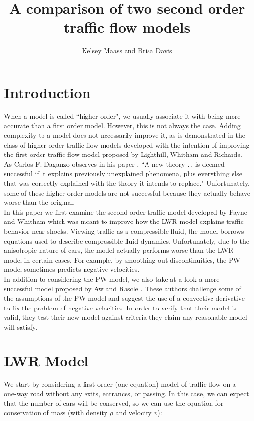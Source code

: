 \documentclass{article}
\title{A comparison of two second order traffic flow models}
\author{Kelsey Maass and Brisa Davis}
\begin{document}
\maketitle

\section{Introduction}
When a model is called ``higher order", we usually associate it with being more accurate than a first order model.  However, this is not always the case.  Adding complexity to a model does not necessarily improve it, as is demonstrated in the class of higher order traffic flow models developed with the intention of improving the first order traffic flow model proposed by Lighthill, Whitham and Richards.  As Carlos F. Daganzo observes in his paper \cite{Daganzo1995}, ``A new theory ... is deemed successful if it explains previously unexplained phenomena, plus everything else that was correctly explained with the theory it intends to replace."  Unfortunately, some of these higher order models are not successful because they actually behave worse than the original.  \\

In this paper we first examine the second order traffic model developed by Payne and Whitham which was meant to improve how the LWR model explains traffic behavior near shocks.  Viewing traffic as a compressible fluid, the model borrows equations used to describe compressible fluid dynamics.  Unfortunately, due to the anisotropic nature of cars, the model actually performs worse than the LWR model in certain cases.  For example, by smoothing out discontinuities, the PW model sometimes predicts negative velocities.  \\

In addition to considering the PW model, we also take at a look a more successful model proposed by Aw and Rascle \cite{AwRascle2000}.  These authors challenge some of the assumptions of the PW model and suggest the use of a convective derivative to fix the problem of negative velocities.  In order to verify that their model is valid, they test their new model against criteria they claim any reasonable model will satisfy.  

\section{LWR Model}
We start by considering a first order (one equation) model of traffic flow on a one-way road without any exits, entrances, or passing.  In this case, we can expect that the number of cars will be conserved, so we can use the equation for conservation of mass (with density $\rho$ and velocity $v$):
\end{document}
